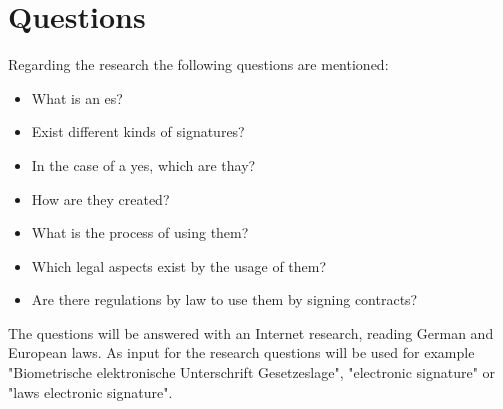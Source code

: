 \section{Questions}

Regarding the research the following questions are mentioned:
\begin{itemize}
	\item What is an \gls{es}?
	\item Exist different kinds of signatures?
	\item In the case of a yes, which are thay?
	\item How are they created?
	\item What is the process of using them?
	\item Which legal aspects exist by the usage of them?
	\item Are there regulations by law to use them by signing contracts?
\end{itemize}

The questions will be answered with an Internet research, reading German and European laws. As input for the research questions will be used for example "Biometrische elektronische Unterschrift Gesetzeslage", "electronic signature" or "laws electronic signature".